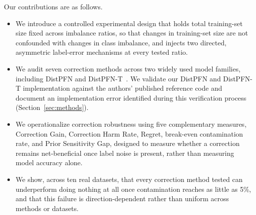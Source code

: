 Our contributions are as follows.

\begin{itemize}
\item We introduce a controlled experimental design that holds total training-set
size fixed across imbalance ratios, so that changes in training-set size are not
confounded with changes in class imbalance, and injects two directed, asymmetric
label-error mechanisms at every tested ratio.
\item We audit seven correction methods across two widely used model families,
including DistPFN and DistPFN-T~\cite{lee2026distpfn}. We validate our DistPFN and
DistPFN-T implementation against the authors' published reference code and document
an implementation error identified during this verification process
(Section~\ref{sec:methods}).
\item We operationalize correction robustness using five complementary measures,
Correction Gain, Correction Harm Rate, Regret, break-even contamination rate,
and Prior Sensitivity Gap, designed to measure whether a correction remains
net-beneficial once label noise is present, rather than measuring model
accuracy alone.
\item We show, across ten real datasets, that every correction method tested can
underperform doing nothing at all once contamination reaches as little as 5\%, and
that this failure is direction-dependent rather than uniform across methods or
datasets.
\end{itemize}
